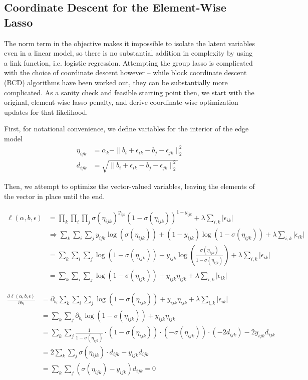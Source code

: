 \documentclass[11pt]{scrartcl}
\begin{document}
\subsection{Coordinate Descent for the Element-Wise Lasso}

The norm term in the objective makes it impossible to isolate the latent variables even in a linear model, so there is no substantial addition in complexity by using a link function, i.e. logistic regression. Attempting the group lasso is complicated with the choice of coordinate descent however -- while block coordinate descent (BCD) algorithms have been worked out, they can be substantially more complicated. As a sanity check and feasible starting point then, we start with the original, element-wise lasso penalty, and derive coordinate-wise optimization updates for that likelihood.

First, for notational convenience, we define variables for the interior of the edge model
\begin{align*}
\eta_{ijk} &= \alpha_k - \|b_i + \epsilon_{ik} - b_j - \epsilon_{jk}\|^2_2\\
d_{ijk} &= \sqrt{\|b_i + \epsilon_{ik} - b_j - \epsilon_{jk}\|^2_2}
\end{align*}

Then, we attempt to optimize the vector-valued variables, leaving the elements of the vector in place until the end.

\begin{align}
\ell(\alpha, b, \epsilon) &= \prod_k \prod_i \prod_{j} \sigma(\eta_{ijk})^{y_{ijk}}(1-\sigma(\eta_{ijk}))^{1-y_{ijk}} + \lambda \sum_{i,k} |\epsilon_{ik}|\\
&\Rightarrow \sum_k \sum_i \sum_{j} y_{ijk}\log(\sigma(\eta_{ijk})) + (1-y_{ijk})\log(1-\sigma(\eta_{ijk})) + \lambda \sum_{i,k} |\epsilon_{ik}|\\
&= \sum_k \sum_i \sum_{j} \log(1-\sigma(\eta_{ijk})) + y_{ijk}\log(\frac{\sigma(\eta_{ijk})}{1- \sigma(\eta_{ijk})})+ \lambda \sum_{i,k} |\epsilon_{ik}|\\
&= \sum_k \sum_i \sum_{j} \log(1-\sigma(\eta_{ijk})) + y_{ijk}\eta_{ijk} + \lambda \sum_{i,k} |\epsilon_{ik}|
\end{align}


\begin{align}
\frac{\partial \ell(\alpha, b, \epsilon)}{\partial b_i} &= \partial_{b_i} \sum_k \sum_i \sum_{j} \log(1-\sigma(\eta_{ijk})) + y_{ijk}\eta_{ijk} + \lambda \sum_{i,k} |\epsilon_{ik}|\\
&= \sum_k \sum_{j} \partial_{b_i} \log(1-\sigma(\eta_{ijk})) + y_{ijk}\eta_{ijk}\\
&= \sum_k \sum_{j} \frac{1}{1-\sigma(\eta_{ijk})} \cdot (1-\sigma(\eta_{ijk})) \cdot(-\sigma(\eta_{ijk})) \cdot (-2d_{ijk}) - 2y_{ijk}d_{ijk}\\
&= 2\sum_k \sum_{j} \sigma(\eta_{ijk}) \cdot d_{ijk} - y_{ijk}d_{ijk}\\
&= \sum_k \sum_{j} (\sigma(\eta_{ijk}) - y_{ijk})d_{ijk} = 0
\end{align}
\end{document}
